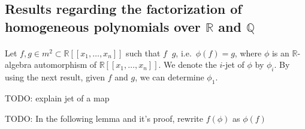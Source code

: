 \documentclass{amsproc}
\DeclareMathOperator{\requiv}{\overset{r}{\sim}}
\begin{document}
\subsection{Results regarding the factorization of homogeneous polynomials over $\mathbb R$ and $\mathbb Q$}
\paragraph{}Let $f,g\in m^2\subset\mathbb R[[x_1,\ldots,x_n]]$ such that
$f\requiv g$, i.e.~$\phi(f)=g$, where $\phi$ is an $\mathbb R$-algebra
automorphism of  $\mathbb R[[x_1,\ldots,x_n]]$. We denote the $i$-jet of $\phi$ by $\phi_i$. By using the next result, given $f$ and $g$, we can determine $\phi_1$.

TODO: explain jet of a map

TODO: In the following lemma and it's proof, rewrite $f(\phi)$ as $\phi(f)$
\end{document}
